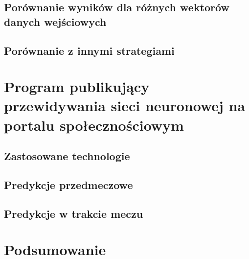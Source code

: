 \section{Porównanie wyników dla różnych wektorów danych wejściowych}
\section{Porównanie z innymi strategiami}

\chapter{Program publikujący przewidywania sieci neuronowej na portalu społecznościowym}
\section{Zastosowane technologie}
\section{Predykcje przedmeczowe}
\section{Predykcje w trakcie meczu}

\chapter{Podsumowanie}


